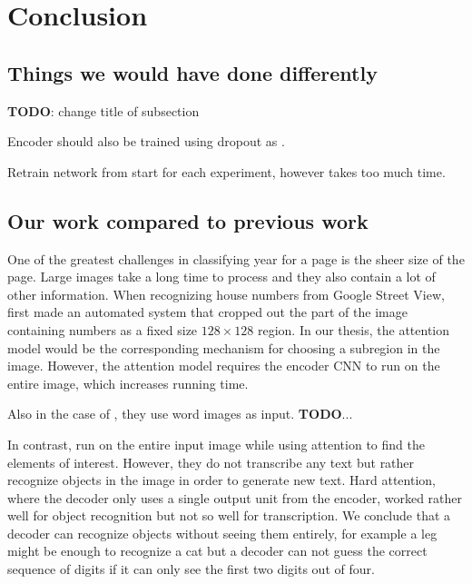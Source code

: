 \section{Conclusion}

\subsection{Things we would have done differently}
\textbf{TODO}: change title of subsection

Encoder should also be trained using dropout as \textcite{multidigit_streetview}.

Retrain network from start for each experiment, however takes too much time.


\subsection{Our work compared to previous work}


One of the greatest challenges in classifying year for a page is the sheer size of the page. Large images take a long time to process and they also contain a lot of other information. When recognizing house numbers from Google Street View, \textcite{multidigit_streetview} first made an automated system that cropped out the part of the image containing numbers as a fixed size $128 \times 128$ region. In our thesis, the attention model would be the corresponding mechanism for choosing a subregion in the image. However, the attention model requires the encoder CNN to run on the entire image, which increases running time.

Also in the case of \cite{FornesCnnCategorization}, they use word images as input.
\textbf{TODO}...

In contrast, \textcite{AttendAndTell} run on the entire input image while using attention to find the elements of interest. However, they do not transcribe any text but rather recognize objects in the image in order to generate new text. Hard attention, where the decoder only uses a single output unit from the encoder, worked rather well for object recognition but not so well for transcription. We conclude that a decoder can recognize objects without seeing them entirely, for example a leg might be enough to recognize a cat but a decoder can not guess the correct sequence of digits if it can only see the first two digits out of four.

